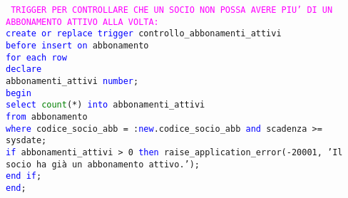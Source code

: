 \documentclass{article}
\begin{document}
    \begin{flushleft}
        \texttt{
        \textcolor{magenta}{TRIGGER PER CONTROLLARE CHE UN SOCIO NON POSSA AVERE PIU' DI UN ABBONAMENTO \hspace*{0.5em}ATTIVO ALLA VOLTA:} \\
        \hspace*{2em} \textcolor{blue}{create or replace trigger} controllo\_abbonamenti\_attivi \\
        \hspace*{2em} \textcolor{blue}{before insert on} abbonamento \\
        \hspace*{2em} \textcolor{blue}{for each row} \\
        \hspace*{2em} \textcolor{blue}{declare} \\
            \hspace*{4em} abbonamenti\_attivi \textcolor{blue}{number}; \\
        \hspace*{2em} \textcolor{blue}{begin} \\
        \hspace*{4em} \textcolor{blue}{select} \textcolor{green}{count}(*) \textcolor{blue}{into} abbonamenti\_attivi \\
        \hspace*{4em} \textcolor{blue}{from} abbonamento \\
        \hspace*{4em} \textcolor{blue}{where} codice\_socio\_abb = :\textcolor{blue}{new}.codice\_socio\_abb \textcolor{blue}{and} scadenza >= sysdate; \\
        \hspace*{4.4em}\textcolor{blue}{if} abbonamenti\_attivi > 0 \textcolor{blue}{then}
            raise\_application\_error(-20001, 'Il socio \hspace*{5.9em}ha già un abbonamento attivo.'); \\
            \hspace*{4em} \textcolor{blue}{end if}; \\
        \hspace*{2em} \textcolor{blue}{end}; \\}
    \end{flushleft}
\end{document}
